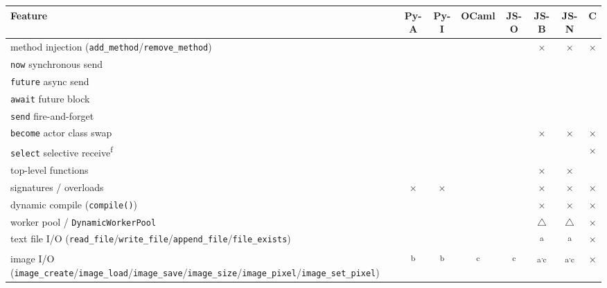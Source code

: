 \documentclass[10pt,a4paper,landscape]{article}
\newcommand{\Yes}{\textcolor{green!50!black}{\textbf{\checkmark}}}
\newcommand{\No}{\textcolor{red!70!black}{$\times$}}
\newcommand{\Part}{\textcolor{orange!80!black}{$\triangle$}}
\begin{document}
\begin{longtable}{F C C C C C C C}
  \toprule
  \textbf{Feature} & \textbf{Py-A} & \textbf{Py-I} & \textbf{OCaml} & \textbf{JS-O} & \textbf{JS-B} & \textbf{JS-N} & \textbf{C} \\
  \midrule
  \endhead

  method injection (\texttt{add\_method}/\texttt{remove\_method}) & \Yes & \Yes & \Yes & \Yes & \No & \No & \No \\
  \texttt{now} synchronous send                                   & \Yes & \Yes & \Yes & \Yes & \Yes & \Yes & \Yes \\
  \texttt{future} async send                                      & \Yes & \Yes & \Yes & \Yes & \Yes & \Yes & \Yes \\
  \texttt{await} future block                                     & \Yes & \Yes & \Yes & \Yes & \Yes & \Yes & \Yes \\
  \texttt{send} fire-and-forget                                   & \Yes & \Yes & \Yes & \Yes & \Yes & \Yes & \Yes \\
  \texttt{become} actor class swap                                & \Yes & \Yes & \Yes & \Yes & \No  & \No  & \No  \\
  \texttt{select} selective receive\textsuperscript{f}            & \Yes & \Yes & \Yes & \Yes & \Yes & \Yes & \No  \\
  top-level functions                                             & \Yes & \Yes & \Yes & \Yes & \No  & \No  & \Yes \\
  signatures / overloads                                          & \No  & \No  & \Yes & \Yes & \No  & \No  & \No  \\
  dynamic compile (\texttt{compile()})                            & \Yes & \Yes & \Yes & \Yes & \No & \No & \No \\
  worker pool / \texttt{DynamicWorkerPool}                        & \Yes & \Yes & \Yes & \Yes & \Part & \Part & \No \\
  text file I/O (\texttt{read\_file}/\texttt{write\_file}/\texttt{append\_file}/\texttt{file\_exists}) & \Yes & \Yes & \Yes & \Yes & \Yes\textsuperscript{a} & \Yes\textsuperscript{a} & \No \\
  image I/O (\texttt{image\_create}/\texttt{image\_load}/\texttt{image\_save}/\texttt{image\_size}/\texttt{image\_pixel}/\texttt{image\_set\_pixel}) & \Yes\textsuperscript{b} & \Yes\textsuperscript{b} & \Yes\textsuperscript{c} & \Yes\textsuperscript{c} & \Yes\textsuperscript{a\textsuperscript{,}c} & \Yes\textsuperscript{a\textsuperscript{,}c} & \No \\
  \bottomrule
\end{longtable}
\end{document}
